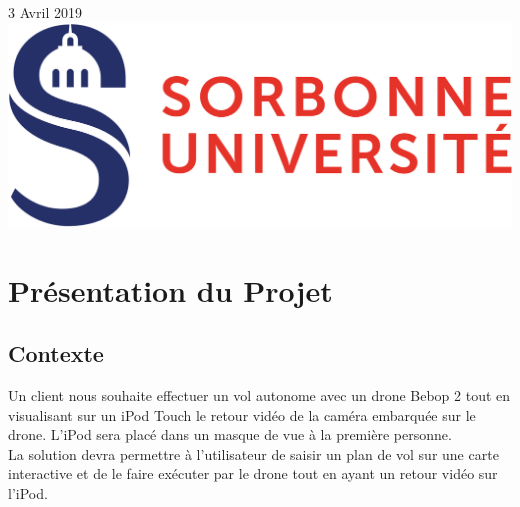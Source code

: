 \documentclass{article}
\begin{document}
\begin{titlepage}

{\large 3 Avril 2019}\\[3cm] %


\includegraphics[scale=0.15]{logo_sorbonne.png} %
 

\vfill %

\end{titlepage}

\newpage
\renewcommand{\contentsname}{\center{Table des Matières}\vspace*{5cm}}

\tableofcontents



\newpage
\section{Présentation du Projet}
	\subsection{Contexte}
		Un client nous souhaite effectuer un vol autonome avec un drone Bebop 2 tout en visualisant sur un iPod Touch le retour vidéo de la caméra embarquée sur le drone. L'iPod sera placé dans un masque de vue à la première personne. \\	
		La solution devra permettre à l'utilisateur de saisir un plan de vol sur une carte interactive et de le faire exécuter par le drone tout en ayant un retour vidéo sur l'iPod.\\
		
\end{document}
